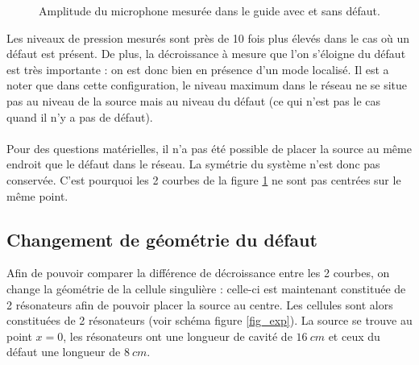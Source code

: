 \begin{figure}[!h]
\begin{minipage}[r]{1 \textwidth}
		\caption{Amplitude du microphone mesurée dans le guide avec et sans défaut.\label{p_tube}}
	\end{minipage}
\end{figure}

Les niveaux de pression mesurés sont près de 10 fois plus élevés dans le cas où un défaut est présent. De plus, la décroissance à mesure que l'on s'éloigne du défaut est très importante : on est donc bien en présence d'un mode localisé. Il est a noter que dans cette configuration, le niveau maximum dans le réseau ne se situe pas au niveau de la source mais au niveau du défaut (ce qui n'est pas le cas quand il n'y a pas de défaut).\\~\\


Pour des questions matérielles, il n'a pas été possible de placer la source au même endroit que le défaut dans le réseau. La symétrie du système n'est donc pas conservée. C'est pourquoi les 2 courbes de la figure \ref{p_tube} ne sont pas centrées sur le même point.

\subsection{Changement de géométrie du défaut}
Afin de pouvoir comparer la différence de décroissance entre les 2 courbes, on change la géométrie de la cellule singulière : celle-ci est maintenant constituée de 2 résonateurs afin de pouvoir placer la source au centre. Les cellules sont alors constituées de 2 résonateurs (voir schéma figure \ref{fig_exp}). La source se trouve au point $x=0$, les résonateurs ont une longueur de cavité de $16~cm$ et ceux du défaut une longueur de $8~cm$.


